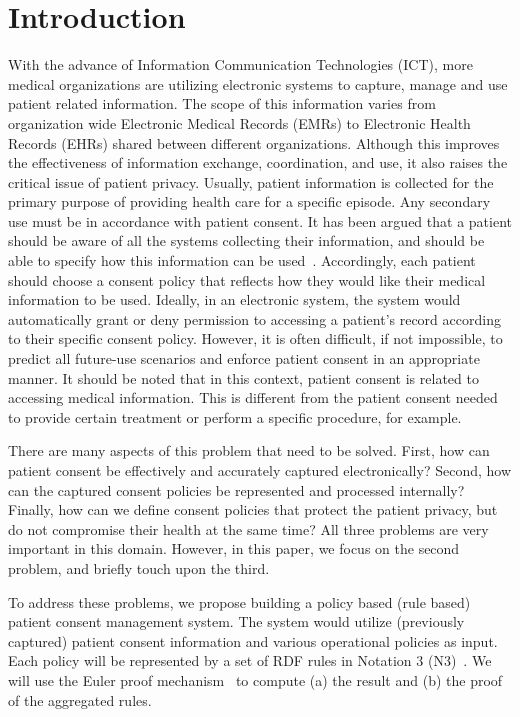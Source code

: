 \documentclass[conference]{IEEEtran}
\begin{document}
\section{Introduction}
With the advance of Information Communication Technologies (ICT), more medical organizations are utilizing electronic systems to capture, manage and use patient
related information.  The scope of this information varies from organization wide Electronic Medical Records (EMRs) to Electronic Health Records (EHRs) shared
between different organizations.  Although this improves the effectiveness of information exchange, coordination, and use, it also raises the critical issue of
patient privacy. Usually, patient information is collected for the primary purpose of providing health care for a specific episode. Any secondary use must be in
accordance with patient consent.  It has been argued that a patient should be aware of all the systems collecting their information, and should be able to
specify how this information can be used~\cite{kluge2004informed}. Accordingly, each patient should choose a consent policy that reflects how they would like
their medical information to be used. Ideally, in an electronic system, the system would automatically grant or deny permission to
accessing a patient's record according to their specific consent policy. However, it is often difficult, if not impossible, to predict all future-use scenarios
and enforce patient consent in an appropriate manner. It should be noted that in this context, patient consent is related to accessing medical information.
This is different from the patient consent needed to provide certain treatment or perform a specific procedure, for example.

There are many aspects of this problem that need to be solved. First, how can patient consent be effectively and accurately captured electronically?
Second, how can the captured consent policies be represented and processed internally? Finally, how can we define consent policies that protect the patient
privacy, but do not compromise their health at the same time? All three problems are very important in this domain. However, in this paper, we focus on the
second problem, and
briefly touch upon the third.


To address these problems, we propose building a policy based (rule based) patient consent management system. The system would utilize (previously captured)
patient consent
information and various operational policies as input. Each policy will be represented by a set of RDF rules in Notation 3 (N3)~\cite{N3not}.  We will use the
Euler proof mechanism~\cite{eurlorprf} to compute (a) the result and (b) the proof of the aggregated rules.  
\end{document}
